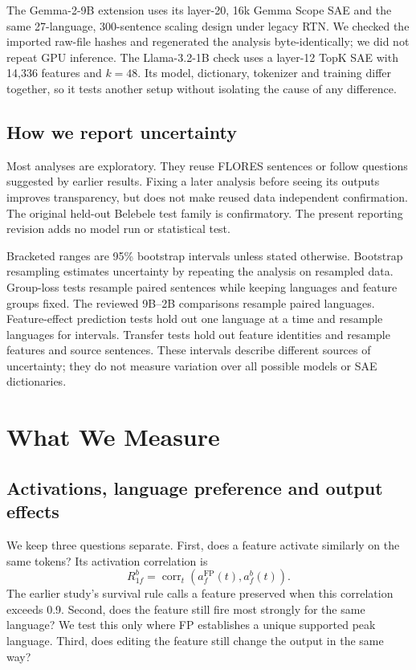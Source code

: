 \documentclass[11pt]{article}
\newcommand{\FP}{\mathrm{FP}}
\begin{document}
The Gemma-2-9B extension uses its layer-20, 16k Gemma Scope SAE and the same 27-language, 300-sentence scaling design under legacy RTN. We checked the imported raw-file hashes and regenerated the analysis byte-identically; we did not repeat GPU inference. The Llama-3.2-1B check uses a layer-12 TopK SAE with 14,336 features and $k=48$. Its model, dictionary, tokenizer and training differ together, so it tests another setup without isolating the cause of any difference.

\subsection{How we report uncertainty}
Most analyses are exploratory. They reuse FLORES sentences or follow questions suggested by earlier results. Fixing a later analysis before seeing its outputs improves transparency, but does not make reused data independent confirmation. The original held-out Belebele test family is confirmatory. The present reporting revision adds no model run or statistical test.

Bracketed ranges are 95\% bootstrap intervals unless stated otherwise. Bootstrap resampling estimates uncertainty by repeating the analysis on resampled data. Group-loss tests resample paired sentences while keeping languages and feature groups fixed. The reviewed 9B--2B comparisons resample paired languages. Feature-effect prediction tests hold out one language at a time and resample languages for intervals. Transfer tests hold out feature identities and resample features and source sentences. These intervals describe different sources of uncertainty; they do not measure variation over all possible models or SAE dictionaries.

\section{What We Measure}
\subsection{Activations, language preference and output effects}
We keep three questions separate. First, does a feature activate similarly on the same tokens? Its activation correlation is
\begin{equation}
 R_{1f}^b=\operatorname{corr}_t(a_f^\FP(t),a_f^b(t)).
\end{equation}
The earlier study's survival rule calls a feature preserved when this correlation exceeds 0.9. Second, does the feature still fire most strongly for the same language? We test this only where FP establishes a unique supported peak language. Third, does editing the feature still change the output in the same way?
\end{document}
